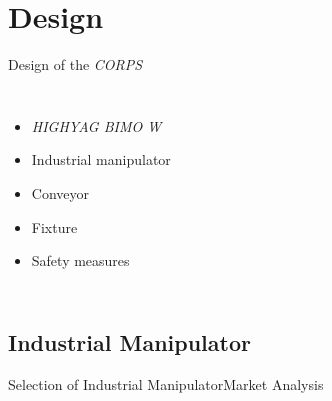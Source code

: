 \section{Design}
\begin{frame}{Design of the \textit{CORPS}}
\begin{columns}
    \begin{itemize}
        \item \textit{HIGHYAG BIMO W}
        \item Industrial manipulator
        \item Conveyor
        \item Fixture
        \item Safety measures
    \end{itemize}
\end{columns}
\end{frame}




\subsection{Industrial Manipulator}
\begin{frame}{Selection of Industrial Manipulator}{Market Analysis}
\end{frame}

